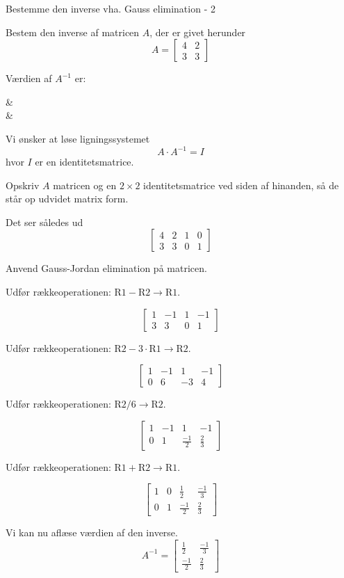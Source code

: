 \documentclass{article}
\begin{document}
\begin{exercise}{Bestemme den inverse vha. Gauss elimination - 2}

Bestem den inverse af matricen $A$, der er givet herunder
\[
A = \left[\begin{array}{cc}
4 & 2 \\ 
3 & 3
\end{array} \right]
\]

Værdien af $A^{-1}$ er:
\begin{answermatrix}
 &  \\
 & 
\end{answermatrix}

\hint
Vi ønsker at løse ligningssystemet
\[
A \cdot A^{-1} = I
\]
hvor $I$ er en identitetsmatrice.

\hint
Opskriv $A$ matricen og en $2 \times 2$ identitetsmatrice
ved siden af hinanden, så de står op udvidet matrix form.

\hint
Det ser således ud
\[
\left[\begin{array}{cc|cc}
4 & 2 & 1 & 0 \\ 
3 & 3 & 0 & 1
\end{array} \right]
\]

\hint
Anvend Gauss-Jordan elimination på matricen.

\hint
Udfør rækkeoperationen: $\text{R1} - \text{R2} \to \text{R1}$.

\hint
\[
\left[\begin{array}{cc|cc}
1 & -1 & 1 & -1 \\ 
3 & 3 & 0 & 1
\end{array} \right]
\]

\hint
Udfør rækkeoperationen: $\text{R2} - 3 \cdot \text{R1} \to \text{R2}$.

\hint
\[
\left[\begin{array}{cc|cc}
1 & -1 & 1 & -1 \\ 
0 & 6 & -3 & 4
\end{array} \right]
\]

\hint
Udfør rækkeoperationen: $\text{R2} / 6 \to \text{R2}$.

\hint
\[
\left[\begin{array}{cc|cc}
1 & -1 & 1 & -1 \\ 
0 & 1 & \frac{-1}{2} & \frac{2}{3}
\end{array} \right]
\]

\hint
Udfør rækkeoperationen: $\text{R1} + \text{R2} \to \text{R1}$.

\hint
\[
\left[\begin{array}{cc|cc}
1 & 0 & \frac{1}{2} & \frac{-1}{3} \\ 
0 & 1 & \frac{-1}{2} & \frac{2}{3}
\end{array} \right]
\]

\hint
Vi kan nu aflæse værdien af den inverse.
\[
A^{-1} = \left[\begin{array}{cc}
\frac{1}{2} & \frac{-1}{3} \\ 
\frac{-1}{2} & \frac{2}{3}
\end{array} \right]
\]


\end{exercise}
\end{document}
